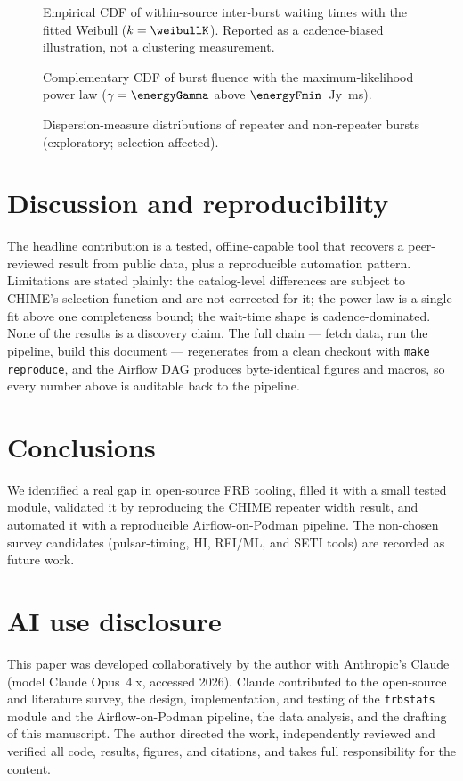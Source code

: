 \documentclass[twocolumn]{aastex631}
\newcommand{\code}[1]{\texttt{#1}}
\begin{document}
\begin{figure}
\caption{Empirical CDF of within-source inter-burst waiting times with the fitted Weibull
($k=\weibullK$). Reported as a cadence-biased illustration, not a clustering measurement.}
\label{fig:wait}
\end{figure}

\begin{figure}
\caption{Complementary CDF of burst fluence with the maximum-likelihood power law
($\gamma=\energyGamma$ above $\energyFmin$~Jy~ms).}
\label{fig:fluence}
\end{figure}

\begin{figure}
\caption{Dispersion-measure distributions of repeater and non-repeater bursts
(exploratory; selection-affected).}
\label{fig:dm}
\end{figure}

\section{Discussion and reproducibility}
The headline contribution is a tested, offline-capable tool that recovers a peer-reviewed
result from public data, plus a reproducible automation pattern. Limitations are stated
plainly: the catalog-level differences are subject to CHIME's selection function and are not
corrected for it; the power law is a single fit above one completeness bound; the wait-time
shape is cadence-dominated. None of the results is a discovery claim. The full chain ---
fetch data, run the pipeline, build this document --- regenerates from a clean checkout with
\code{make reproduce}, and the Airflow DAG produces byte-identical figures and macros, so
every number above is auditable back to the pipeline.

\section{Conclusions}
We identified a real gap in open-source FRB tooling, filled it with a small tested module,
validated it by reproducing the CHIME repeater width result, and automated it with a
reproducible Airflow-on-Podman pipeline. The non-chosen survey candidates (pulsar-timing,
HI, RFI/ML, and SETI tools) are recorded as future work.

\section*{AI use disclosure}
This paper was developed collaboratively by the author with Anthropic's Claude
\citep{anthropicclaude} (model Claude Opus~4.x, accessed 2026). Claude contributed to the
open-source and literature survey, the design, implementation, and testing of the
\code{frbstats} module and the Airflow-on-Podman pipeline, the data analysis, and the
drafting of this manuscript. The author directed the work, independently reviewed and verified
all code, results, figures, and citations, and takes full responsibility for the content.
\end{document}
